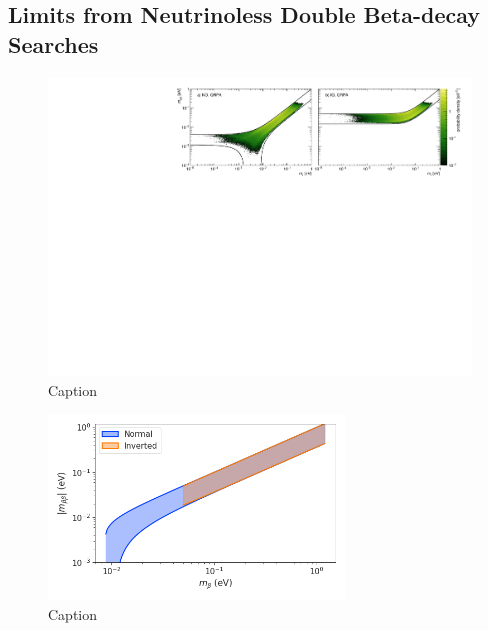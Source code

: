 
\subsection{Limits from Neutrinoless Double Beta-decay Searches}

\begin{figure}[htbp]
    \centering
    \includegraphics[width=1.0\textwidth]{figs/Chapter-2/230228_nu_mass_0nbb.pdf}
    \caption{Caption}
    \label{fig:nu_mass_0nbb_posterior}
\end{figure}

\begin{figure}[htbp]
    \centering
    \includegraphics[width=0.7\textwidth]{figs/Chapter-2/230301_mbb_vs_mb.png}
    \caption{Caption}
    \label{fig:nu_mass_0nbb_vs_nu_beta}
\end{figure}

